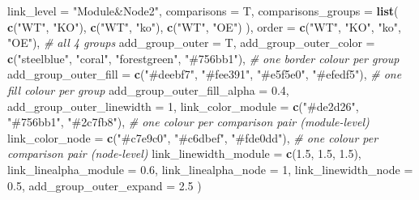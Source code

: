 \documentclass[
]{book}
\newenvironment{Shaded}{\begin{snugshade}}{\end{snugshade}}
\newcommand{\AttributeTok}[1]{\textcolor[rgb]{0.13,0.29,0.53}{#1}}
\newcommand{\CommentTok}[1]{\textcolor[rgb]{0.56,0.35,0.01}{\textit{#1}}}
\newcommand{\DecValTok}[1]{\textcolor[rgb]{0.00,0.00,0.81}{#1}}
\newcommand{\FloatTok}[1]{\textcolor[rgb]{0.00,0.00,0.81}{#1}}
\newcommand{\FunctionTok}[1]{\textcolor[rgb]{0.13,0.29,0.53}{\textbf{#1}}}
\newcommand{\NormalTok}[1]{#1}
\newcommand{\StringTok}[1]{\textcolor[rgb]{0.31,0.60,0.02}{#1}}
\begin{document}
\begin{Shaded}
\begin{Highlighting}[]
  \AttributeTok{link\_level                   =} \StringTok{"Module\&Node2"}\NormalTok{,}
  \AttributeTok{comparisons                  =}\NormalTok{ T,}
  \AttributeTok{comparisons\_groups           =} \FunctionTok{list}\NormalTok{(}
    \FunctionTok{c}\NormalTok{(}\StringTok{"WT"}\NormalTok{, }\StringTok{"KO"}\NormalTok{),}
    \FunctionTok{c}\NormalTok{(}\StringTok{"WT"}\NormalTok{, }\StringTok{"ko"}\NormalTok{),}
    \FunctionTok{c}\NormalTok{(}\StringTok{"WT"}\NormalTok{, }\StringTok{"OE"}\NormalTok{)}
\NormalTok{  ),}
  \AttributeTok{order                        =} \FunctionTok{c}\NormalTok{(}\StringTok{"WT"}\NormalTok{, }\StringTok{"KO"}\NormalTok{, }\StringTok{"ko"}\NormalTok{, }\StringTok{"OE"}\NormalTok{),                }\CommentTok{\# all 4 groups}
  \AttributeTok{add\_group\_outer              =}\NormalTok{ T,}
  \AttributeTok{add\_group\_outer\_color        =} \FunctionTok{c}\NormalTok{(}\StringTok{"steelblue"}\NormalTok{, }\StringTok{"coral"}\NormalTok{, }\StringTok{"forestgreen"}\NormalTok{, }\StringTok{"\#756bb1"}\NormalTok{),  }\CommentTok{\# one border colour per group}
  \AttributeTok{add\_group\_outer\_fill         =} \FunctionTok{c}\NormalTok{(}\StringTok{"\#deebf7"}\NormalTok{, }\StringTok{"\#fee391"}\NormalTok{, }\StringTok{"\#e5f5e0"}\NormalTok{, }\StringTok{"\#efedf5"}\NormalTok{),      }\CommentTok{\# one fill colour per group}
  \AttributeTok{add\_group\_outer\_fill\_alpha   =} \FloatTok{0.4}\NormalTok{,}
  \AttributeTok{add\_group\_outer\_linewidth    =} \DecValTok{1}\NormalTok{,}
  \AttributeTok{link\_color\_module            =} \FunctionTok{c}\NormalTok{(}\StringTok{"\#de2d26"}\NormalTok{, }\StringTok{"\#756bb1"}\NormalTok{, }\StringTok{"\#2c7fb8"}\NormalTok{),       }\CommentTok{\# one colour per comparison pair (module{-}level)}
  \AttributeTok{link\_color\_node              =} \FunctionTok{c}\NormalTok{(}\StringTok{"\#c7e9c0"}\NormalTok{, }\StringTok{"\#c6dbef"}\NormalTok{, }\StringTok{"\#fde0dd"}\NormalTok{),       }\CommentTok{\# one colour per comparison pair (node{-}level)}
  \AttributeTok{link\_linewidth\_module        =} \FunctionTok{c}\NormalTok{(}\FloatTok{1.5}\NormalTok{, }\FloatTok{1.5}\NormalTok{, }\FloatTok{1.5}\NormalTok{),}
  \AttributeTok{link\_linealpha\_module        =} \FloatTok{0.6}\NormalTok{,}
  \AttributeTok{link\_linealpha\_node          =} \DecValTok{1}\NormalTok{,}
  \AttributeTok{link\_linewidth\_node          =} \FloatTok{0.5}\NormalTok{,}
  \AttributeTok{add\_group\_outer\_expand       =} \FloatTok{2.5}
\NormalTok{)}
\end{Highlighting}
\end{Shaded}
\end{document}
